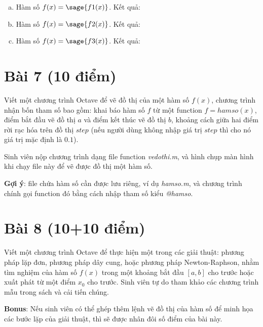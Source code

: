\documentclass[12pt]{article}
\begin{document}
\begin{enumerate}[a)]
\item Hàm số $f(x)=\sage{f1(x)}$. Kết quả:

\begin{center}  \end{center}

\item Hàm số $f(x)=\sage{f2(x)}$. Kết quả:

\begin{center}  \end{center}

\item Hàm số $f(x)=\sage{f3(x)}$. Kết quả:

\begin{center}  \end{center}
\end{enumerate}

\section{Bài 7 (10 điểm)}
Viết một chương trình Octave để vẽ đồ thị của một hàm số $f(x)$, chương trình nhận bốn tham số bao gồm: khai báo hàm số $f$ từ một function $f=hamso(x)$, điểm bắt đầu vẽ đồ thị $a$ và điểm kết thúc vẽ đồ thị $b$, khoảng cách giữa hai điểm rời rạc hóa trên đồ thị $step$ (nếu người dùng không nhập giá trị $step$ thì cho nó giá trị mặc định là $0.1$).

Sinh viên nộp chương trình dạng file function \emph{vedothi.m}, và hình chụp màn hình khi chạy file này để vẽ được đồ thị một hàm số.

\textbf{Gợi ý}: file chứa hàm số cần được lưu riêng, ví dụ \emph{hamso.m}, và chương trình chính gọi function đó bằng cách nhập tham số kiểu \emph{@hamso}.

\section{Bài 8 (10+10 điểm)}
Viết một chương trình Octave để thực hiện một trong các giải thuật: phương pháp lặp đơn, phương pháp dây cung, hoặc phương pháp Newton-Raphson, nhằm tìm nghiệm của hàm số $f(x)$ trong một khoảng bắt đầu $[a,b]$ cho trước hoặc xuất phát từ một điểm $x_0$ cho trước. Sinh viên tự do tham khảo các chương trình mẫu trong sách và cải tiến chúng.

\textbf{Bonus}: Nếu sinh viên có thể ghép thêm lệnh vẽ đồ thị của hàm số để minh họa các bước lặp của giải thuật, thì sẽ được nhân đôi số điểm của bài này.
\end{document}
